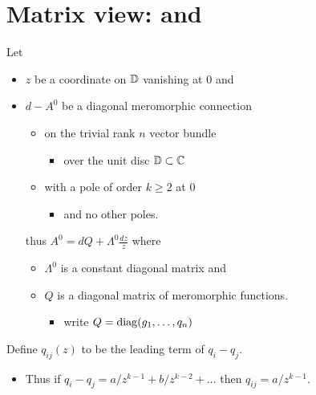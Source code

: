 \section{Matrix view: \cite{boalch} and \cite{thboalch}} %
Let
\begin{itemize}
  \item $z$ be a coordinate on $\mathbb{D}$ vanishing at $0$ and
  \item $d-A^0$ be a diagonal meromorphic connection
    \begin{itemize}
      \item on the trivial rank $n$ vector bundle
        \begin{itemize}
          \item over the unit disc $\mathbb{D}\subset\mathbb{C}$
        \end{itemize}
      \item with a pole of order $k\geq2$ at $0$
        \begin{itemize}
          \item and no other poles.
        \end{itemize}
    \end{itemize}
    thus $A^0=dQ+\Lambda^0\frac{dz}{z}$ where
    \begin{itemize}
      \item $\Lambda^0$ is a constant diagonal matrix and
      \item $Q$ is a diagonal matrix of meromorphic functions.
        \begin{itemize}
          \item write $Q=\operatorname{diag}(g_1,\dots,q_n)$
        \end{itemize}
    \end{itemize}
\end{itemize}
Define $q_{ij}(z)$ to be the leading term of $q_i-q_j$.
\begin{itemize}
  \item Thus if $q_i-q_j=a/z^{k-1}+b/z^{k-2}+\dots$ then $q_{ij}=a/z^{k-1}$.
\end{itemize}
